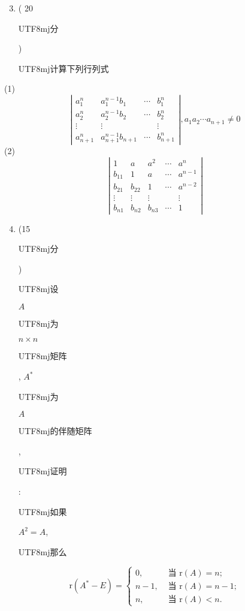 \documentclass[10pt]{article}
\begin{document}
\begin{enumerate}
  \setcounter{enumi}{2}
  \item ( 20 \begin{CJK}{UTF8}{mj}分\end{CJK}) \begin{CJK}{UTF8}{mj}计算下列行列式\end{CJK}
\end{enumerate}
(1)
$$
\left|\begin{array}{cccc}
a_{1}^{n} & a_{1}^{n-1} b_{1} & \cdots & b_{1}^{n} \\
a_{2}^{n} & a_{2}^{n-1} b_{2} & \cdots & b_{2}^{n} \\
\vdots & \vdots & & \vdots \\
a_{n+1}^{n} & a_{n+1}^{n-1} b_{n+1} & \cdots & b_{n+1}^{n}
\end{array}\right|, a_{1} a_{2} \cdots a_{n+1} \neq 0
$$
(2)
$$
\left|\begin{array}{ccccc}
1 & a & a^{2} & \cdots & a^{n} \\
b_{11} & 1 & a & \cdots & a^{n-1} \\
b_{21} & b_{22} & 1 & \cdots & a^{n-2} \\
\vdots & \vdots & \vdots & & \vdots \\
b_{n 1} & b_{n 2} & b_{n 3} & \cdots & 1
\end{array}\right|
$$

\begin{enumerate}
  \setcounter{enumi}{3}
  \item (15 \begin{CJK}{UTF8}{mj}分\end{CJK}) \begin{CJK}{UTF8}{mj}设\end{CJK} $A$ \begin{CJK}{UTF8}{mj}为\end{CJK} $n \times n$ \begin{CJK}{UTF8}{mj}矩阵\end{CJK}, $A^{*}$ \begin{CJK}{UTF8}{mj}为\end{CJK} $A$ \begin{CJK}{UTF8}{mj}的伴随矩阵\end{CJK}, \begin{CJK}{UTF8}{mj}证明\end{CJK}: \begin{CJK}{UTF8}{mj}如果\end{CJK} $A^{2}=A$, \begin{CJK}{UTF8}{mj}那么\end{CJK}
\end{enumerate}
$$
\mathrm{r}\left(A^{*}-E\right)= \begin{cases}0, & \text { 当 } \mathrm{r}(A)=n ; \\ n-1, & \text { 当 } \mathrm{r}(A)=n-1 ; \\ n, & \text { 当 } \mathrm{r}(A)<n .\end{cases}
$$
\end{document}

